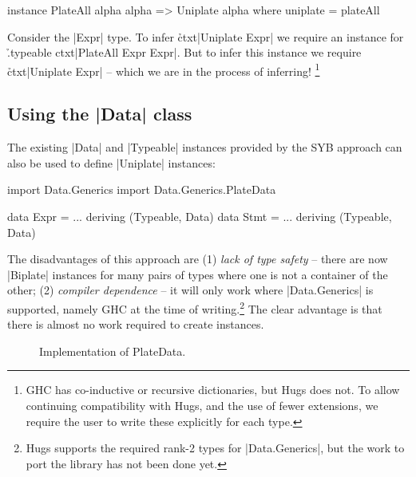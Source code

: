\ignore\begin{code}
instance PlateAll alpha alpha => Uniplate alpha where
    uniplate = plateAll
\end{code}

Consider the |Expr| type. To infer \h{ctxt}|Uniplate Expr| we require an instance for \h{.typeable ctxt}|PlateAll Expr Expr|. But to infer this instance we require \h{ctxt}|Uniplate Expr| -- which we are in the process of inferring! \footnote{GHC has co-inductive or recursive dictionaries, but Hugs does not. To allow continuing compatibility with Hugs, and the use of fewer extensions, we require the user to write these explicitly for each type.}


\subsection{Using the |Data| class}
\label{secU:implement_playdata}

The existing |Data| and |Typeable| instances provided by the SYB approach can also be used to define |Uniplate| instances:

\ignore\begin{code}
import Data.Generics
import Data.Generics.PlateData

data Expr  = ... \? \? deriving (Typeable, Data)
data Stmt  = ... \? \? deriving (Typeable, Data)
\end{code}

The disadvantages of this approach are (1) \textit{lack of type safety} -- there are now |Biplate| instances for many pairs of types where one is not a container of the other; (2) \textit{compiler dependence} -- it will only work where |Data.Generics| is supported, namely GHC at the time of writing.\footnote{Hugs supports the required rank-2 types for |Data.Generics|, but the work to port the library has not been done yet.} The clear advantage is that there is almost no work required to create instances.

\begin{figure}
\ignore{}
\caption{Implementation of PlateData.}
\label{figU:platedata}
\end{figure}

